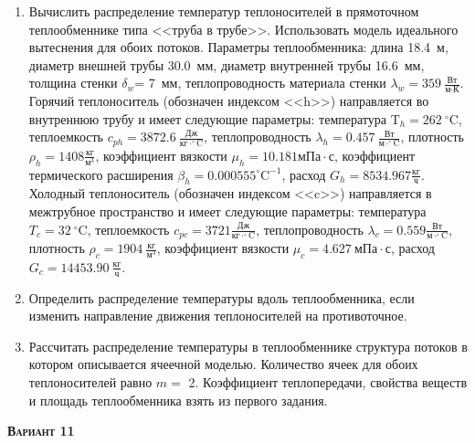 \begin{enumerate} 
\item Вычислить распределение температур теплоносителей в прямоточном теплообменнике типа <<труба в трубе>>. Использовать модель идеального вытеснения для обоих потоков. Параметры теплообменника: длина  18.4~м, диаметр внешней трубы 30.0~мм,  диаметр внутренней трубы 16.6~мм, толщина стенки $\delta_{w}$=     7~мм,  теплопроводность материала стенки $\lambda_{w}=  359~\frac{\text{Вт}}{\text{м} \cdot \text{К}}$.  Горячий теплоноситель (обозначен индексом <<h>>) направляется во внутреннюю трубу и	 имеет следующие параметры: температура $\text{T}_{h}= 262~^\circ\mathrm{C}$, теплоемкость	  $c_{p{h}}= 3872.6~\frac{\text{Дж}}{\text{кг} \cdot ^\circ\mathrm{C}}$, теплопроводность 		$\lambda_{h}= 0.457~\frac{\text{Вт}}{\text{м} \cdot ^\circ\mathrm{C}}$, плотность 		$\rho_{h}= 1408 \frac{\text{кг}}{\text{м}^3}$, коэффициент вязкости $\mu_{h}=10.181 \text{мПа} 		\cdot \text{с} $, коэффициент термического расширения $\beta_{h}=0.000555 ^\circ\mathrm{C}^{-1}$,		 расход $G_{h}= 8534.967 \frac{\text{кг}}{\text{ч}}$. Холодный теплоноситель (обозначен индексом <<c>>) 		 направляется в межтрубное пространство и имеет следующие параметры: температура $T_{c}=   32		 ~^\circ\mathrm{C}$, теплоемкость $c_{p{c}}= 3721 \frac{\text{Дж}}{\text{кг} \cdot ^\circ\mathrm{C}}$,			 теплопроводность $\lambda_{c}=0.559 \frac{\text{Вт}}{\text{м} \cdot ^\circ\mathrm{C}}$, плотность 			 $\rho_{c}=  1904~\frac{\text{кг}}{\text{м}^3}$, коэффициент вязкости $\mu_{c}=4.627~\text{мПа} \cdot \text{с} $, 			 расход $G_{c}=14453.90~\frac{\text{кг}}{\text{ч}}$. 

\item Определить распределение температуры вдоль теплообменника, если 	изменить направление движения теплоносителей на противоточное.

\item Рассчитать распределение температуры в теплообменнике структура потоков в котором описывается ячеечной моделью. Количество ячеек для обоих теплоносителей равно $m = $ 2. Коэффициент теплопередачи, свойства веществ и площадь теплообменника взять из первого задания.

\end{enumerate}

\textsc{\textbf{Вариант 11}}

